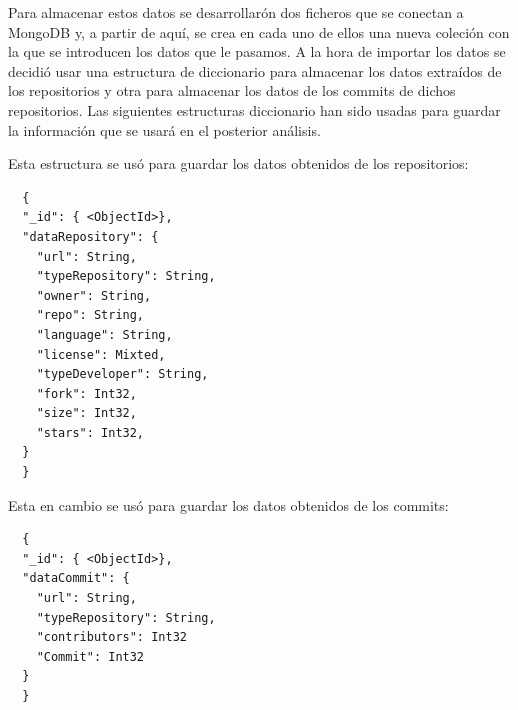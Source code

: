 \documentclass[a4paper, 12pt]{book}
\begin{document}
Para almacenar estos datos se desarrollarón dos ficheros que se conectan a MongoDB y, a partir de aquí, se crea en cada uno de ellos una nueva coleción con la que se introducen los datos que le pasamos.
A la hora de importar los datos se decidió usar una estructura de diccionario para almacenar los datos extraídos de los repositorios y otra para almacenar los datos de los commits de dichos repositorios.
Las siguientes estructuras diccionario han sido usadas para guardar la información que se usará en el posterior análisis. 


Esta estructura se usó para guardar los datos obtenidos de los repositorios:
{\footnotesize
\begin{verbatim}
  {
  "_id": { <ObjectId>},
  "dataRepository": {
    "url": String,
    "typeRepository": String,
    "owner": String,
    "repo": String,
    "language": String,
    "license": Mixted,
    "typeDeveloper": String,
    "fork": Int32,
    "size": Int32,
    "stars": Int32,
  }
  }
\end{verbatim}
}


Esta en cambio se usó para guardar los datos obtenidos de los commits:
{\footnotesize
\begin{verbatim}
  {
  "_id": { <ObjectId>},
  "dataCommit": {
    "url": String,
    "typeRepository": String,
    "contributors": Int32
    "Commit": Int32
  }
  }
\end{verbatim}
}
\end{document}
